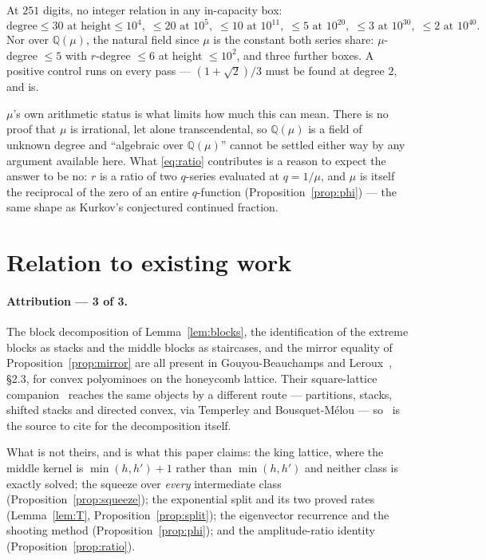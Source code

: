 \documentclass[11pt]{article}
\newcommand{\Q}{\mathbb{Q}}
\begin{document}
At $251$ digits, no integer relation in any in-capacity box:
\[
  \text{degree} \le 30 \text{ at height} \le 10^4, \;\le 20 \text{ at } 10^5,
  \;\le 10 \text{ at } 10^{11}, \;\le 5 \text{ at } 10^{20},
  \;\le 3 \text{ at } 10^{30}, \;\le 2 \text{ at } 10^{40}.
\]
Nor over $\Q(\mu)$, the natural field since $\mu$ is the constant both series
share: $\mu$-degree $\le 5$ with $r$-degree $\le 6$ at height $\le 10^2$, and
three further boxes. A positive control runs on every pass --- $(1+\sqrt2)/3$
must be found at degree $2$, and is.

$\mu$'s own arithmetic status is what limits how much this can mean. There is no
proof that $\mu$ is irrational, let alone transcendental, so $\Q(\mu)$ is a
field of unknown degree and ``algebraic over $\Q(\mu)$'' cannot be settled
either way by any argument available here. What \eqref{eq:ratio} contributes is
a reason to expect the answer to be no: $r$ is a ratio of two $q$-series
evaluated at $q = 1/\mu$, and $\mu$ is itself the reciprocal of the zero of an
entire $q$-function (Proposition~\ref{prop:phi}) --- the same shape as Kurkov's
conjectured continued fraction.

\section{Relation to existing work}
\label{sec:related}

\paragraph{Attribution --- 3 of 3.} The block decomposition of
Lemma~\ref{lem:blocks}, the identification of the extreme blocks as stacks and
the middle blocks as staircases, and the mirror equality of
Proposition~\ref{prop:mirror} are all present in Gouyou-Beauchamps and
Leroux~\cite{gblRoux2004}, \S2.3, for convex polyominoes on the honeycomb
lattice. Their square-lattice companion~\cite{lrr1998} reaches the same objects
by a different route --- partitions, stacks, shifted stacks and directed convex,
via Temperley and Bousquet-M\'elou --- so~\cite{gblRoux2004} is the source to
cite for the decomposition itself.

What is not theirs, and is what this paper claims: the king lattice, where the
middle kernel is $\min(h,h')+1$ rather than $\min(h,h')$ and neither class is
exactly solved; the squeeze over \emph{every} intermediate class
(Proposition~\ref{prop:squeeze}); the exponential split and its two proved rates
(Lemma~\ref{lem:T}, Proposition~\ref{prop:split}); the eigenvector recurrence
and the shooting method (Proposition~\ref{prop:phi}); and the amplitude-ratio
identity (Proposition~\ref{prop:ratio}).
\end{document}
